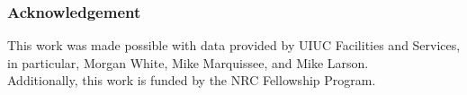 \begin{frame}
  \frametitle{Acknowledgement}
  This work was made possible with data provided by UIUC Facilities and Services,
  in particular, Morgan White, Mike Marquissee, and Mike Larson. \\
  Additionally, this work is funded by the NRC Fellowship Program. \\
\end{frame}
